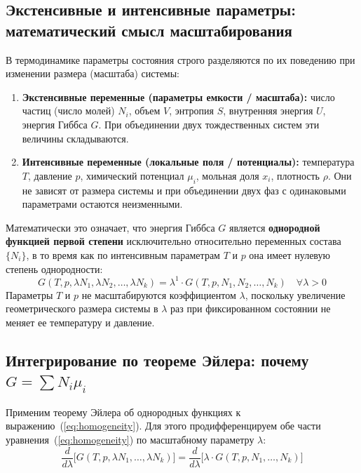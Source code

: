\documentclass[12pt,a4paper]{article}
\begin{document}
\subsection[Экстенсивные и интенсивные параметры]{Экстенсивные и интенсивные параметры: математический смысл масштабирования}
В термодинамике параметры состояния строго разделяются по их поведению при изменении размера (масштаба) системы:
\begin{enumerate}
    \item \textbf{Экстенсивные переменные (параметры емкости / масштаба):} число частиц (число молей) $N_i$, объем $V$, энтропия $S$, внутренняя энергия $U$, энергия Гиббса $G$. При объединении двух тождественных систем эти величины складываются.
    \item \textbf{Интенсивные переменные (локальные поля / потенциалы):} температура $T$, давление $p$, химический потенциал $\mu_i$, мольная доля $x_i$, плотность $\rho$. Они не зависят от размера системы и при объединении двух фаз с одинаковыми параметрами остаются неизменными.
\end{enumerate}

Математически это означает, что энергия Гиббса $G$ является \textbf{однородной функцией первой степени} исключительно относительно переменных состава $\{N_i\}$, в то время как по интенсивным параметрам $T$ и $p$ она имеет нулевую степень однородности:
\begin{equation}
    G(T, p, \lambda N_1, \lambda N_2, \dots, \lambda N_k) = \lambda^1 \cdot G(T, p, N_1, N_2, \dots, N_k) \quad \forall \lambda > 0
    \label{eq:homogeneity}
\end{equation}
Параметры $T$ и $p$ не масштабируются коэффициентом $\lambda$, поскольку увеличение геометрического размера системы в $\lambda$ раз при фиксированном состоянии не меняет ее температуру и давление.


\subsection{Интегрирование по теореме Эйлера: почему \texorpdfstring{$G = \sum N_i \mu_i$}{G = sum Ni mui}}
Применим теорему Эйлера об однородных функциях к выражению~(\ref{eq:homogeneity}). Для этого продифференцируем обе части уравнения~(\ref{eq:homogeneity}) по масштабному параметру $\lambda$:
\begin{equation}
    \frac{d}{d\lambda} \Big[ G(T, p, \lambda N_1, \dots, \lambda N_k) \Big] = \frac{d}{d\lambda} \Big[ \lambda \cdot G(T, p, N_1, \dots, N_k) \Big]
    \label{eq:euler_diff}
\end{equation}
\end{document}
